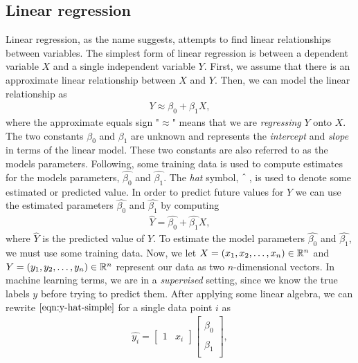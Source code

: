 \subsection{Linear regression}
\label{sec:linear-regression}
Linear regression, as the name suggests, attempts to find linear relationships between variables. The simplest form of linear regression is between a dependent variable $X$ and a single independent variable $Y$. First, we assume that there is an approximate linear relationship between $X$ and $Y$. Then, we can model the linear relationship as
\begin{align}
    Y \approx \beta_0 + \beta_1 X,
\end{align}
where the approximate equals sign "$\approx$" means that we are \textit{regressing} $Y$ onto $X$. The two constants $\beta_0$ and $\beta_1$ are unknown and represents the \textit{intercept} and \textit{slope} in terms of the linear model. These two constants are also referred to as the models parameters. Following, some training data is used to compute estimates for the models parameters, $\hat{\beta_0}$ and $\hat{\beta_1}$. The \textit{hat} symbol, $\string^$\,, is used to denote some estimated or predicted value. In order to predict future values for $Y$ we can use the estimated parameters $\hat{\beta_0}$ and $\hat{\beta_1}$ by computing
\begin{align}
    \hat{Y} = \hat{\beta_0} + \hat{\beta_1}X,
    \label{eqn:y-hat-simple}
\end{align}
where $\hat{Y}$ is the predicted value of $Y$. To estimate the model parameters $\hat{\beta_0}$ and $\hat{\beta_1}$, we must use some training data. Now, we let $X = (x_1, x_2, \ldots, x_n) \in \mathbb{R}^n$ and $Y = (y_1, y_2, \ldots, y_n) \in \mathbb{R}^n$ represent our data as two $n$-dimensional vectors. In machine learning terms, we are in a \textit{supervised} setting, since we know the true labels $y$ before trying to predict them. After applying some linear algebra, we can rewrite $\cref{eqn:y-hat-simple}$ for a single data point $i$ as
\begin{align}
    \hat{y_i} =
        \begin{bmatrix}
            1 & x_i
        \end{bmatrix}
        \begin{bmatrix}
            \hat{\beta}_0 \\
            \hat{\beta}_1 \\
        \end{bmatrix},
    \label{eqn:y-hat-two-matrix-form-single-point}
\end{align}
